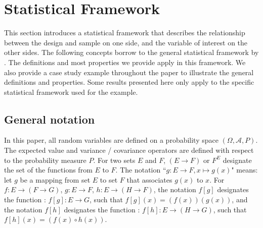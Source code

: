 \section{Statistical Framework} \label{sec:stat_fra}
This section introduces a statistical framework that describes the relationship between the design and sample on one side, and the variable of interest on the other sides. The following concepts borrow to  the general statistical framework by  \cite{dbb1}. The definitions and most properties we provide apply in this framework. We also provide a case study example throughout the paper to illustrate the general definitions and properties. Some results presented here only apply to the specific statistical framework used for the example.

\subsection{General notation}

In this paper, all random variables are defined on a probability space $(\Omega,\mathscr{A},P)$. The expected value and variance / covariance operators are defined with respect to the probability measure $P$. 
For two sets $E$ and $F$, $(E\to F)$ or $F^E$ designate the set of the functions from $E$ to $F$.
The notation ``$g:E\to F,x\mapsto g(x)$" means: let $g$ be a mapping from set $E$ to set $F$ that associates $g(x)$ to $x$. For $f:E\to (F\to G)$, $g:E\to F$, $h:E\to (H\to F)$,  the notation $f[g]$ designates the function :  $f[g]:E\to G$, such that $f[g](x)=(f(x))(g(x))$, and the notation 
$f[h]$ designates the function :  $f[h]:E\to (H\to G)$, such that $f[h](x)=(f(x)\circ h(x))$.


